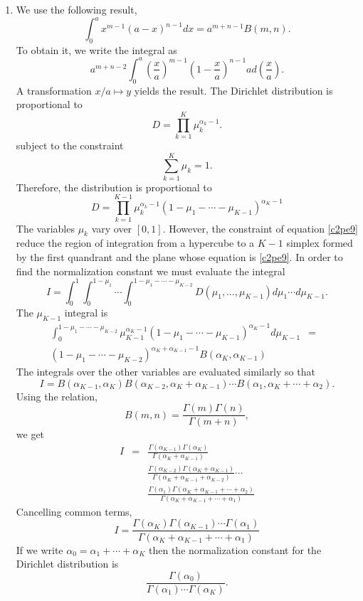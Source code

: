 \begin{enumerate}
\item We use the following result,
\begin{equation}\label{c2pe8}
\int_0^a x^{m-1}(a - x)^{n-1}dx = a^{m+n-1}B(m, n).
\end{equation}
To obtain it, we write the integral as
\[
a^{m+n-2}\int_0^a \left(\frac{x}{a}\right)^{m-1}\left(1 - \frac{x}{a}\right)^{n-1}ad\left(\frac{x}{a}\right).
\]
A transformation $x/a \mapsto y$ yields the result. The Dirichlet distribution is proportional
to 
\[
D = \prod_{k=1}^K\mu_k^{\alpha_k - 1}.
\]
subject to the constraint 
\begin{equation}\label{c2pe9}
\sum_{k=1}^K\mu_k = 1.
\end{equation}
Therefore, the distribution is proportional to
\[
D = \prod_{k=1}^{K-1}\mu_k^{\alpha_k - 1}(1 - \mu_1 - \cdots - \mu_{K-1})^{\alpha_K-1}
\]
The variables $\mu_k$ vary over $[0, 1]$. However, the constraint of equation \eqref{c2pe9} reduce the
region of integration from a hypercube to a $K-1$ simplex formed by the first quandrant and the plane whose 
equation is \eqref{c2pe9}. In order to find the normalization constant we must evaluate the integral
\begin{equation}\label{c2pe10}
I = \int_0^1\int_0^{1-\mu_1}\cdots\int_0^{1-\mu_1-\cdots-\mu_{K-2}}D(\mu_1, \ldots, \mu_{K-1})d\mu_1\cdots d\mu_{K-1}.
\end{equation}
The $\mu_{K-1}$ integral is
\begin{eqnarray*}
\int_0^{1-\mu_1-\cdots-\mu_{K-2}}\mu_{K-1}^{\alpha_K - 1}(1 - \mu_1 - \cdots - \mu_{K-1})^{\alpha_K-1}d\mu_{K-1} &=& \\
 (1-\mu_1-\cdots-\mu_{K-2})^{\alpha_K+\alpha_{K-1}-1}B(\alpha_K, \alpha_{K-1}) & &
\end{eqnarray*}
The integrals over the other variables are evaluated similarly so that
\[
I = B(\alpha_{K-1},\alpha_K)B(\alpha_{K-2},\alpha_{K}+\alpha_{K-1})\cdots B(\alpha_1,\alpha_{K}+\cdots+\alpha_2).
\]
Using the relation,
\[
B(m, n) = \frac{\Gamma(m)\Gamma(n)}{\Gamma(m+n)},
\]
we get
\begin{eqnarray*}
I &=& \frac{\Gamma(\alpha_{K-1})\Gamma(\alpha_K)}{\Gamma(\alpha_{K}+\alpha_{K-1})} \\
  & &  \frac{\Gamma(\alpha_{K-2})\Gamma(\alpha_K+\alpha_{K-1})}{\Gamma(\alpha_K+\alpha_{K-1}+\alpha_{K-2})}\cdots \\
  & &  \frac{\Gamma(\alpha_1)\Gamma(\alpha_K+\alpha_{K-1}+\cdots+\alpha_2)}{\Gamma(\alpha_K+\alpha_{K-1}+\cdots+\alpha_{1})}
\end{eqnarray*}
Cancelling common terms,
\[
I = \frac{\Gamma(\alpha_K)\Gamma(\alpha_{K-1})\cdots\Gamma(\alpha_1)}{\Gamma(\alpha_K+\alpha_{K-1}+\cdots+\alpha_1)}
\]
If we write $\alpha_0 = \alpha_1 + \cdots + \alpha_K$ then the normalization constant for the
Dirichlet distribution is
\[
\frac{\Gamma(\alpha_0)}{\Gamma(\alpha_1)\cdots\Gamma(\alpha_K)}.
\]


\end{enumerate}
